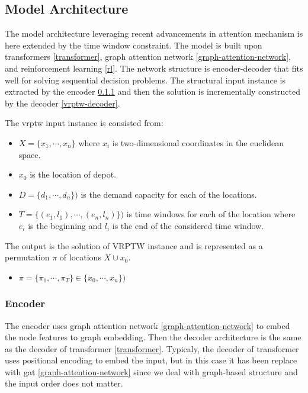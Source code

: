     \subsection{Model Architecture}
    The model architecture \cite{attention-route} leveraging recent advancements in attention mechanism is here extended by the time window constraint. The model is built upon transformers \ref{transformer}, graph attention network \ref{graph-attention-network}, and reinforcement learning \ref{rl}. The network structure is encoder-decoder that fits well for solving sequential decision problems. The structural input instance is extracted by the encoder \ref{vrptw-encoder} and then the solution is incrementally constructed by the decoder \ref{vrptw-decoder}.
    
    The \gls{vrptw} input instance is consisted from:
    \begin{itemize}\label{input-data}
        \item $X = \{x_1, \cdots, x_n\}$ where $x_i$ is two-dimensional coordinates in the euclidean space.
        \item $x_0$ is the location of depot.
        \item $D = \{d_1, \cdots, d_n\})$ is the demand capacity for each of the locations.
        \item $T = \{(e_1, l_1), \cdots, (e_n, l_n)\})$ is time windows for each of the location where $e_i$ is the beginning and $l_i$ is the end of the considered time window.
    \end{itemize}
    
    The output is the solution of VRPTW instance and is represented as a permutation $\pi$ of locations $X \cup x_0$.
    \begin{itemize}
        \item $\pi = \{\pi_1, \cdots, \pi_T\} \in \{x_0, \cdots, x_n\})$ 
    \end{itemize}
    
    \subsubsection{Encoder}\label{vrptw-encoder}
    The encoder uses graph attention network \ref{graph-attention-network} to embed the node features to graph embedding. Then the decoder architecture is the same as the decoder of transformer \ref{transformer}. Typicaly, the decoder of transformer uses positional encoding \cite{positional-encoding} to embed the input, but in this case it has been replace with \gls{gat} \ref{graph-attention-network} since we deal with graph-based structure and the input order does not matter.
    
